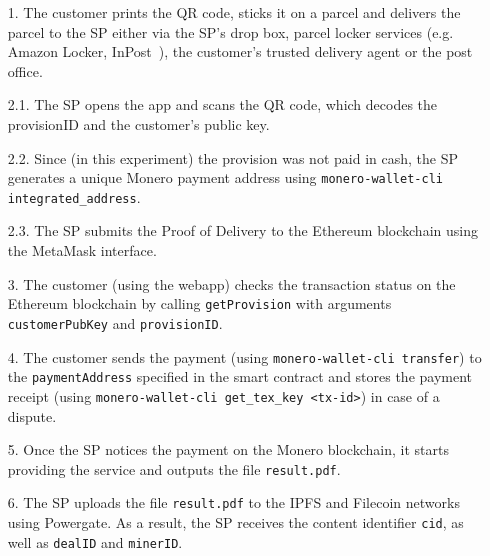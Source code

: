 \documentclass[pdftex,twocolumn,epjc3]{svjour3}
\begin{document}
{\begin{enumerate}
  \item[1.] The customer prints the QR code, sticks it on a parcel and delivers the parcel to the SP either via the SP's drop box, parcel locker services (e.g. Amazon Locker, InPost~\cite{inpostParcelLockerService}), the customer's trusted delivery agent or the post office.

  \item[2.1.] The SP opens the app and scans the QR code, which decodes the provisionID and the customer's public key.

  \item[2.2.] Since (in this experiment) the provision was not paid in cash, the SP generates a unique Monero payment address using \texttt{monero-wallet-cli integrated\_address}. 
  \item[2.3.] The SP submits the Proof of Delivery to the Ethereum blockchain using the MetaMask interface. 

  \item[3.] The customer (using the webapp) checks the transaction status on the Ethereum blockchain by calling \texttt{getProvision} with arguments \texttt{customerPubKey} and \texttt{provisionID}.

  \item[4.] The customer sends the payment (using \texttt{monero-wallet-cli transfer}) to the \texttt{paymentAddress} specified in the smart contract and stores the payment receipt (using \texttt{monero-wallet-cli get\_tex\_key <tx-id>}) in case of a dispute.
  \item[5.] Once the SP notices the payment on the Monero blockchain, it starts providing the service and outputs the file \texttt{result.pdf}.

  \item[6.] The SP uploads the file \texttt{result.pdf} to the IPFS and Filecoin networks using Powergate. As a result, the SP receives the content identifier \texttt{cid}, as well as \texttt{dealID} and \texttt{minerID}.


\end{enumerate}}
\end{document}
